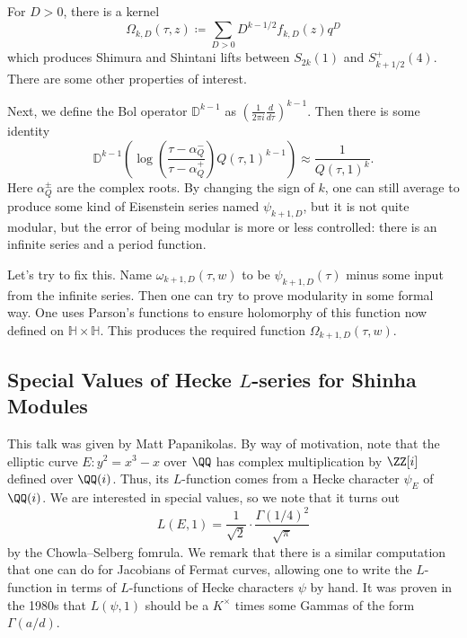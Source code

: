 \documentclass{article}
\begin{document}
For $D>0$, there is a kernel
\[\Omega_{k,D}(\tau,z)\coloneqq\sum_{D>0}D^{k-1/2}f_{k,D}(z)q^D\]
which produces Shimura and Shintani lifts between $S_{2k}(1)$ and $S_{k+1/2}^+(4)$. There are some other properties of interest.

Next, we define the Bol operator $\mathbb D^{k-1}$ as $\left(\frac1{2\pi i}\frac{d}{d\tau}\right)^{k-1}$. Then there is some identity
\[\mathbb D^{k-1}\left(\log\left(\frac{\tau-\alpha_Q^-}{\tau-\alpha_Q^+}\right)Q(\tau,1)^{k-1}\right)\approx\frac1{Q(\tau,1)^k}.\]
Here $\alpha_Q^\pm$ are the complex roots.
By changing the sign of $k$, one can still average to produce some kind of Eisenstein series named $\psi_{k+1,D}$, but it is not quite modular, but the error of being modular is more or less controlled: there is an infinite series and a period function.

Let's try to fix this. Name $\omega_{k+1,D}(\tau,w)$ to be $\psi_{k+1,D}(\tau)$ minus some input from the infinite series. Then one can try to prove modularity in some formal way. One uses Parson's functions to ensure holomorphy of this function now defined on $\mathbb H\times\mathbb H$. This produces the required function $\Omega_{k+1,D}(\tau,w)$.

\subsection{Special Values of Hecke \texorpdfstring{$L$}{ L}-series for Shinha Modules}
This talk was given by Matt Papanikolas. By way of motivation, note that the elliptic curve $E\colon y^2=x^3-x$ over $\QQ$ has complex multiplication by $\ZZ[i]$ defined over $\QQ(i)$. Thus, its $L$-function comes from a Hecke character $\psi_E$ of $\QQ(i)$. We are interested in special values, so we note that it turns out
\[L(E,1)=\frac1{\sqrt2}\cdot\frac{\Gamma(1/4)^2}{\sqrt\pi}\]
by the Chowla--Selberg fomrula. We remark that there is a similar computation that one can do for Jacobians of Fermat curves, allowing one to write the $L$-function in terms of $L$-functions of Hecke characters $\psi$ by hand. It was proven in the 1980s that $L(\psi,1)$ should be a $K^\times$ times some Gammas of the form $\Gamma(a/d)$.
\end{document}
